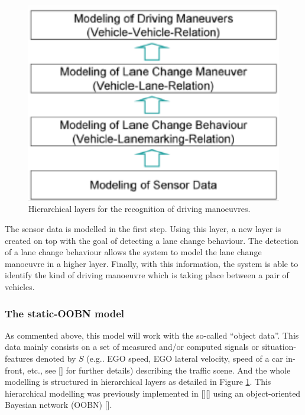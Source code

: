 \begin{figure}
\begin{center}
\includegraphics[scale=0.35]{./figures/DaimlerHierarchicalModelling}
\caption{\label{Figure:DaimlerHierarchicalModelling} Hierarchical layers for the recognition of driving manoeuvres.}
\end{center}
\end{figure}

The sensor data is modelled in the first step. Using this layer, a new layer is created on top with the goal of detecting a lane change behaviour. The detection of a lane change behaviour allows the system to model the lane change manoeuvre in a higher layer. Finally, with this information, the system is able to identify the kind of driving manoeuvre which is taking place between a pair of vehicles. 



\subsubsection*{The static-OOBN model}

As commented above, this model will work with the so-called ``object data''. This data mainly consists on a set of measured and/or computed signals or situation-features denoted by $S$ (e.g.. EGO speed, EGO lateral velocity, speed of a car in-front, etc., see [] for further details) describing the traffic scene. And the whole modelling is structured in hierarchical layers as detailed in Figure \ref{Figure:DaimlerHierarchicalModelling}. This hierarchical modelling was previously implemented in [][] using an object-oriented Bayesian network (OOBN) []. 


